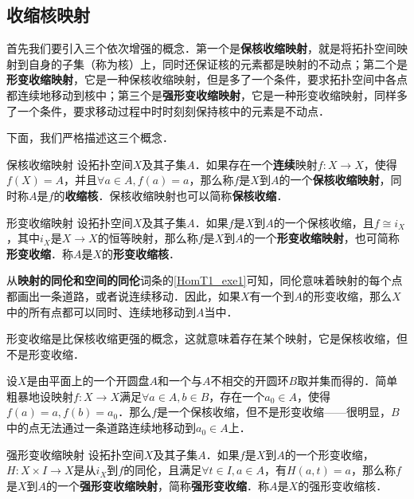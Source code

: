 \subsection{收缩核映射}

首先我们要引入三个依次增强的概念．第一个是\textbf{保核收缩映射}，就是将拓扑空间映射到自身的子集（称为核）上，同时还保证核的元素都是映射的不动点；第二个是\textbf{形变收缩映射}，它是一种保核收缩映射，但是多了一个条件，要求拓扑空间中各点都连续地移动到核中；第三个是\textbf{强形变收缩映射}，它是一种形变收缩映射，同样多了一个条件，要求移动过程中时时刻刻保持核中的元素是不动点．

下面，我们严格描述这三个概念．

\begin{definition}{保核收缩映射}
设拓扑空间$X$及其子集$A$．如果存在一个\textbf{连续}映射$f:X\rightarrow X$，使得$f(X)=A$，并且$\forall a\in A, f(a)=a$，那么称$f$是$X$到$A$的一个\textbf{保核收缩映射}，同时称$A$是$f$的\textbf{收缩核}．保核收缩映射也可以简称\textbf{保核收缩}．
\end{definition}

\begin{definition}{形变收缩映射}
设拓扑空间$X$及其子集$A$．如果$f$是$X$到$A$的一个保核收缩，且$f\cong i_X$，其中$i_X$是$X\rightarrow X$的恒等映射，那么称$f$是$X$到$A$的一个\textbf{形变收缩映射}，也可简称\textbf{形变收缩}．称$A$是$X$的\textbf{形变收缩核}．
\end{definition}

从\textbf{映射的同伦和空间的同伦}词条的\autoref{HomT1_exe1}可知，同伦意味着映射的每个点都画出一条道路，或者说连续移动．因此，如果$X$有一个到$A$的形变收缩，那么$X$中的所有点都可以同时、连续地移动到$A$当中．

形变收缩是比保核收缩更强的概念，这就意味着存在某个映射，它是保核收缩，但不是形变收缩．

\begin{example}{}
设$X$是由平面上的一个开圆盘$A$和一个与$A$不相交的开圆环$B$取并集而得的．简单粗暴地设映射$f:X\rightarrow X$满足$\forall a\in A, b\in B$，存在一个$a_0\in A$，使得$f(a)=a, f(b)=a_0$．那么$f$是一个保核收缩，但不是形变收缩——很明显，$B$中的点无法通过一条道路连续地移动到$a_0\in A$上．
\end{example}

\begin{definition}{强形变收缩映射}
设拓扑空间$X$及其子集$A$．如果$f$是$X$到$A$的一个形变收缩，$H:X\times I\rightarrow X$是从$i_X$到$f$的同伦，且满足$\forall t\in I, a\in A$，有$H(a, t)=a$，那么称$f$是$X$到$A$的一个\textbf{强形变收缩映射}，简称\textbf{强形变收缩}．称$A$是$X$的强形变收缩核．
\end{definition}

